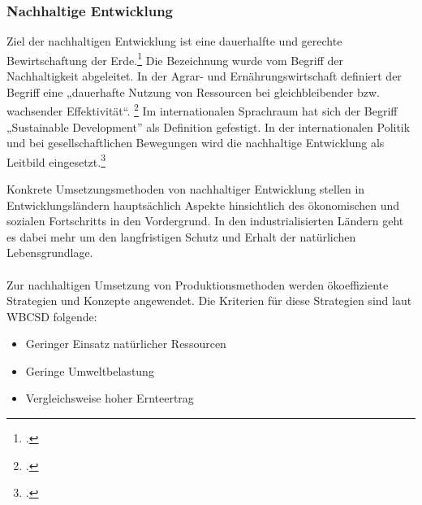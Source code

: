 \documentclass{scrartcl}
\begin{document}
\subsubsection{Nachhaltige Entwicklung} \label{NE}
 Ziel der nachhaltigen Entwicklung ist eine dauerhalfte und gerechte Bewirtschaftung der Erde.\footcite{NachhaltigeBrockhaus.de} Die Bezeichnung wurde vom Begriff der Nachhaltigkeit abgeleitet. In der Agrar- und Ernährungswirtschaft definiert der Begriff eine „dauerhafte Nutzung von Ressourcen bei gleichbleibender bzw. wachsender Effektivität“. \footcite{oppenhauser2010nachhaltigkeit} Im internationalen Sprachraum hat sich der Begriff „Sustainable Development” als Definition gefestigt. In der internationalen Politik und bei gesellschaftlichen Bewegungen wird die nachhaltige Entwicklung als Leitbild eingesetzt.\footcite{oppenhauser2010nachhaltigkeit}
 
 Konkrete Umsetzungsmethoden von nachhaltiger Entwicklung stellen in Entwicklungsländern hauptsächlich Aspekte hinsichtlich des ökonomischen und sozialen Fortschritts in den Vordergrund. In den industrialisierten Ländern geht es dabei mehr um den langfristigen Schutz und Erhalt der natürlichen Lebensgrundlage.\\
\\
 Zur nachhaltigen Umsetzung von Produktionsmethoden werden ökoeffiziente Strategien und Konzepte angewendet. Die Kriterien für diese Strategien sind laut WBCSD folgende:
\begin{itemize}
\item Geringer Einsatz natürlicher Ressourcen
\item Geringe Umweltbelastung
\item Vergleichsweise hoher Ernteertrag
\end{itemize}
\end{document}
